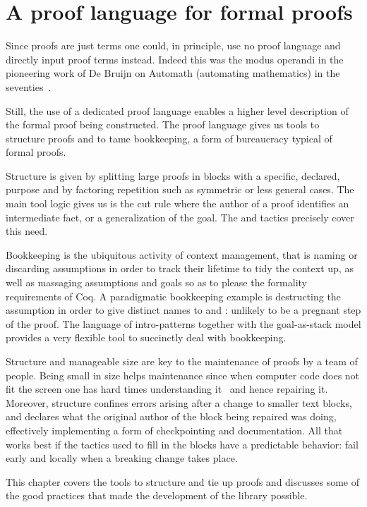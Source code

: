 \chapter{A proof language for formal proofs}{}
\label{ch:script}


Since proofs are just terms one could, in principle, use no proof
language and directly input proof terms instead.  Indeed this was the
modus operandi in the pioneering work of De Bruijn on Automath
(automating mathematics) in the seventies~\cite{nederpelt-94}.

Still, the use of a dedicated proof language enables a higher level
description of the formal proof being constructed.  
The \mcbSSR{} proof language gives us tools to structure proofs and
to tame bookkeeping, a form of bureaucracy typical of formal proofs.

Structure is given by splitting large proofs in blocks with a
specific, declared, purpose and by factoring repetition such as
symmetric or less general cases. The main tool logic gives us is the
cut rule where the author of a proof identifies an intermediate fact,
or a generalization of the goal. The  and  tactics
precisely cover this need.

Bookkeeping is the ubiquitous activity of context management, that is
naming or discarding assumptions in order to track their lifetime to tidy
the context up, as well as massaging assumptions and goals so as to
please the formality requirements of Coq.  A paradigmatic bookkeeping
example is destructing the assumption  in order to give
distinct names to  and : unlikely to be a pregnant step of
the proof.  The language of intro-patterns together with the
goal-as-stack model provides a very flexible tool to
succinctly deal with bookkeeping.

Structure and manageable size are key to the maintenance of proofs by
a team of people.  Being small in size helps maintenance since when
computer code does not fit the screen one has hard times understanding
it~\cite{Weinberg:1985:PCP:536771} and hence repairing it.  Moreover,
structure confines errors arising after a change to smaller text
blocks, and declares what the original author of the block being
repaired was doing, effectively implementing a form of checkpointing
and documentation.  All that works best if the tactics used to fill in
the blocks have a predictable behavior: fail early and locally when a
breaking change takes place.

This chapter covers the tools to structure and tie up proofs and discusses
some of the good practices that made the development of the \mcbMC{}
library possible.

